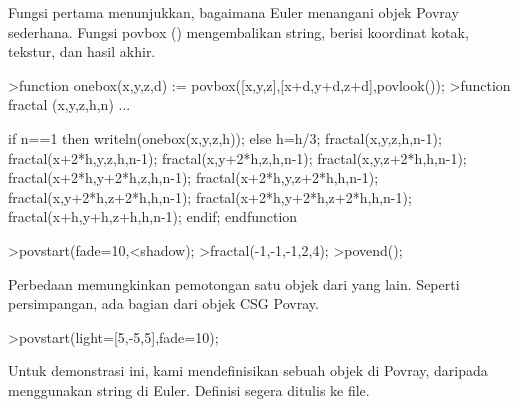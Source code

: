 \documentclass{article}
\begin{document}
\begin{eulernotebook}
\begin{eulercomment}
\begin{eulercomment}
\begin{eulercomment}
\begin{eulercomment}
\begin{eulercomment}
\begin{eulercomment}
\begin{eulercomment}
\begin{eulercomment}
\begin{eulercomment}
\begin{eulercomment}
\begin{eulercomment}
\begin{eulercomment}
\begin{eulercomment}
\begin{eulercomment}
\begin{eulercomment}
\begin{eulercomment}
\begin{eulercomment}
\begin{eulercomment}
\begin{eulercomment}
\begin{eulercomment}
\begin{eulercomment}
\begin{eulercomment}
\begin{eulercomment}
\begin{eulercomment}
\begin{eulercomment}
Fungsi pertama menunjukkan, bagaimana Euler menangani objek Povray
sederhana. Fungsi povbox () mengembalikan string, berisi koordinat
kotak, tekstur, dan hasil akhir.
\end{eulercomment}
\begin{eulerprompt}
>function onebox(x,y,z,d) := povbox([x,y,z],[x+d,y+d,z+d],povlook());
>function fractal (x,y,z,h,n) ...
\end{eulerprompt}
\begin{eulerudf}
   if n==1 then writeln(onebox(x,y,z,h));
   else
     h=h/3;
     fractal(x,y,z,h,n-1);
     fractal(x+2*h,y,z,h,n-1);
     fractal(x,y+2*h,z,h,n-1);
     fractal(x,y,z+2*h,h,n-1);
     fractal(x+2*h,y+2*h,z,h,n-1);
     fractal(x+2*h,y,z+2*h,h,n-1);
     fractal(x,y+2*h,z+2*h,h,n-1);
     fractal(x+2*h,y+2*h,z+2*h,h,n-1);
     fractal(x+h,y+h,z+h,h,n-1);
   endif;
  endfunction
\end{eulerudf}
\begin{eulerprompt}
>povstart(fade=10,<shadow);
>fractal(-1,-1,-1,2,4);
>povend();
\end{eulerprompt}
\begin{eulercomment}
Perbedaan memungkinkan pemotongan satu objek dari yang lain. Seperti
persimpangan, ada bagian dari objek CSG Povray.
\end{eulercomment}
\begin{eulerprompt}
>povstart(light=[5,-5,5],fade=10);
\end{eulerprompt}
\begin{eulercomment}
Untuk demonstrasi ini, kami mendefinisikan sebuah objek di Povray,
daripada menggunakan string di Euler. Definisi segera ditulis ke file.


\end{eulercomment}
\end{eulercomment}
\end{eulercomment}
\end{eulercomment}
\end{eulercomment}
\end{eulercomment}
\end{eulercomment}
\end{eulercomment}
\end{eulercomment}
\end{eulercomment}
\end{eulercomment}
\end{eulercomment}
\end{eulercomment}
\end{eulercomment}
\end{eulercomment}
\end{eulercomment}
\end{eulercomment}
\end{eulercomment}
\end{eulercomment}
\end{eulercomment}
\end{eulercomment}
\end{eulercomment}
\end{eulercomment}
\end{eulercomment}
\end{eulercomment}
\end{eulernotebook}
\end{document}
